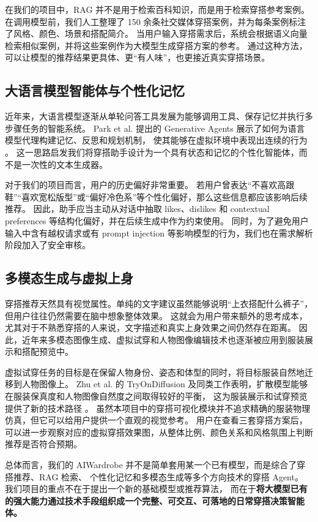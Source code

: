 \documentclass{applemlr}
\begin{document}
在我们的项目中，RAG 并不是用于检索百科知识，而是用于检索穿搭参考案例。
在调用模型前，我们人工整理了 150 余条社交媒体穿搭案例，并为每条案例标注了风格、颜色、场景和搭配简介。
当用户输入穿搭需求后，系统会根据语义向量检索相似案例，并将这些案例作为大模型生成穿搭方案的参考。
通过这种方法，可以让模型的推荐结果更具体、更“有人味”，也更接近真实穿搭场景。

\subsection{大语言模型智能体与个性化记忆}

近年来，大语言模型逐渐从单轮问答工具发展为能够调用工具、保存记忆并执行多步骤任务的智能系统。
Park et al. 提出的 Generative Agents 展示了如何为语言模型代理构建记忆、反思和规划机制，
使其能够在虚拟环境中表现出连续的行为 \citep{park2023generative}。
这一思路启发我们将穿搭助手设计为一个具有状态和记忆的个性化智能体，而不是一次性的文本生成器。

对于我们的项目而言，用户的历史偏好非常重要。
若用户曾表达“不喜欢高跟鞋”“喜欢宽松版型”或“偏好冷色系”等个性化偏好，那么这些信息都应该影响后续推荐。
因此，助手应当主动从对话中抽取 likes、dislikes 和 contextual preferences 等结构化偏好，并在后续生成中作为约束使用。
同时，为了避免用户输入中含有越权请求或有 prompt injection 等影响模型的行为，我们也在需求解析阶段加入了安全审核。

\subsection{多模态生成与虚拟上身}

穿搭推荐天然具有视觉属性。单纯的文字建议虽然能够说明“上衣搭配什么裤子”，但用户往往仍然需要在脑中想象整体效果。
这就会为用户带来额外的思考成本，尤其对于不熟悉穿搭的人来说，文字描述和真实上身效果之间仍然存在距离。
因此，近年来多模态图像生成、虚拟试穿和人物图像编辑技术也逐渐被应用到服装展示和搭配预览中。

虚拟试穿任务的目标是在保留人物身份、姿态和体型的同时，将目标服装自然地迁移到人物图像上。
Zhu et al. 的 TryOnDiffusion 及同类工作表明，扩散模型能够在服装保真度和人物图像自然度之间取得较好的平衡，
这为服装展示和试穿预览提供了新的技术路径 \citep{zhu2023tryondiffusion}。
虽然本项目中的穿搭可视化模块并不追求精确的服装物理仿真，但它可以给用户提供一个直观的视觉参考。
用户在查看三套穿搭方案后，可以进一步观察对应的虚拟穿搭效果图，从整体比例、颜色关系和风格氛围上判断推荐是否符合预期。

总体而言，我们的 AIWardrobe 并不是简单套用某一个已有模型，而是综合了穿搭推荐、RAG 检索、
个性化记忆和多模态生成等多个方向技术的穿搭 Agent。
我们项目的重点不在于提出一个新的基础模型或推荐算法，
而在于\textbf{将大模型已有的强大能力通过技术手段组织成一个完整、可交互、可落地的日常穿搭决策智能体。}
\end{document}
